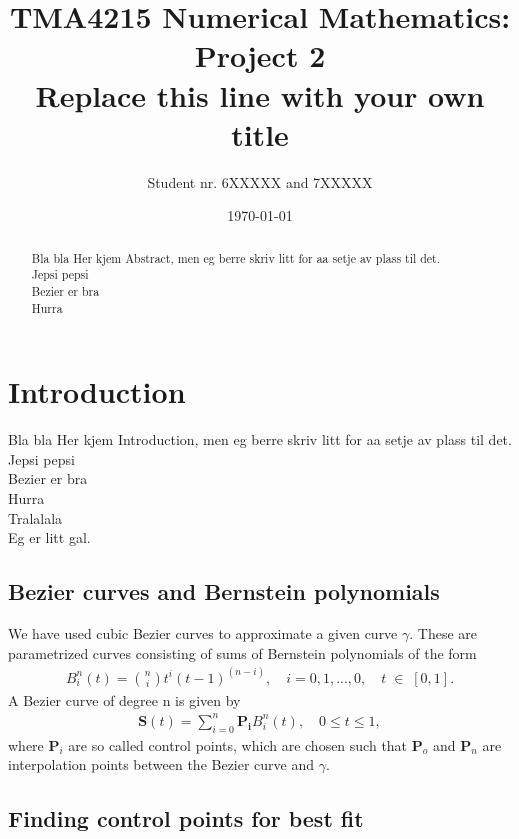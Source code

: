 \documentclass[10pt]{article}
\title{TMA4215 Numerical Mathematics: Project 2 \\ Replace this line with your own title}
\author{Student nr. 6XXXXX and 7XXXXX} %
\date{\today}
\begin{document}
\maketitle
\begin{abstract}

Bla bla Her kjem Abstract, men eg berre skriv litt for aa setje av plass til det. \\
Jepsi pepsi \\
Bezier er bra \\
Hurra \\

\end{abstract}

\section{Introduction} 

Bla bla Her kjem Introduction, men eg berre skriv litt for aa setje av plass til det. \\
Jepsi pepsi \\
Bezier er bra \\
Hurra \\
Tralalala \\
Eg er litt gal. \\



\subsection*{Bezier curves and Bernstein polynomials}

We have used cubic Bezier curves to approximate a given curve $\gamma$. These are parametrized curves consisting of sums of Bernstein polynomials of the form
\begin{align}
B_{i}^n(t) = \binom{n}{i}t^i(t-1)^{(n-i)},\quad i = 0, 1, ..., 0,\quad t \; \in \; [0,1].
\end{align}
A Bezier curve of degree n is given by
\begin{align}
\mathbf{S}(t) = \sum_{i=0}^{n} \mathbf{P_i} B_{i}^n(t), \quad 0 \leq t \leq 1,
\end{align}
where $\mathbf{P}_i$ are so called control points, which are chosen such that $\mathbf{P}_o$ and $\mathbf{P}_n$ are interpolation points between the Bezier curve and $\gamma$.


\subsection*{Finding control points for best fit}
\end{document}
